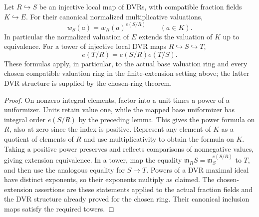 \begin{lemma}
\label{fw:normalized-valuation-scaling}
\leanok
Let $R\hookrightarrow S$ be an injective local map of DVRs, with
compatible fraction fields $K\hookrightarrow E$. For their canonical
normalized multiplicative valuations,
\[
 w_S(a)=w_R(a)^{e(S/R)}\qquad(a\in K).
\]
In particular the normalized valuation of $E$ extends the valuation of
$K$ up to equivalence. For a tower of injective local DVR maps
$R\hookrightarrow S\hookrightarrow T$,
\[
 e(T/R)=e(S/R)e(T/S).
\]
These formulas apply, in particular, to the actual base valuation ring
and every chosen compatible valuation ring in the finite-extension
setting above; the latter DVR structure is supplied by the chosen-ring
theorem.
\end{lemma}
\begin{proof}
On nonzero integral elements, factor into a unit times a power of a
uniformizer. Units retain value one, while the mapped base uniformizer
has integral order $e(S/R)$ by the preceding lemma. This gives the
power formula on $R$, also at zero since the index is positive.
Represent any element of $K$ as a quotient of elements of $R$ and use
multiplicativity to obtain the formula on $K$. Taking a positive
power preserves and reflects comparisons of nonnegative values, giving
extension equivalence. In a tower, map the equality
$\mathfrak m_RS=\mathfrak m_S^{e(S/R)}$ to $T$, and then use the analogous
equality for $S\to T$. Powers of a DVR maximal ideal have distinct
exponents, so their exponents multiply as claimed.
The chosen-extension assertions are these statements applied to the
actual fraction fields and the DVR structure already proved for the
chosen ring. Their canonical inclusion maps satisfy the required towers.
\end{proof}

